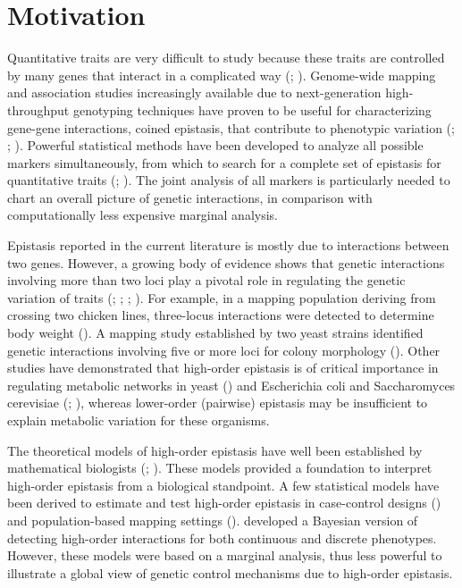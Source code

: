 \documentclass[11pt,]{book}
\theoremstyle{definition}
\theoremstyle{definition}
\theoremstyle{remark}
\begin{document}
\section{Motivation}\label{motivation-1}

Quantitative traits are very difficult to study because these traits are
controlled by many genes that interact in a complicated way
(\cite{nelson2013century}; \cite{mackay2014epistasis}). Genome-wide
mapping and association studies increasingly available due to
next-generation high-throughput genotyping techniques have proven to be
useful for characterizing gene-gene interactions, coined epistasis, that
contribute to phenotypic variation (\cite{cordell2009detecting};
\cite{van2011travelling}; \cite{wei2014detecting}). Powerful statistical
methods have been developed to analyze all possible markers
simultaneously, from which to search for a complete set of epistasis for
quantitative traits (\cite{li2014fast}; \cite{gosik2016iform}). The
joint analysis of all markers is particularly needed to chart an overall
picture of genetic interactions, in comparison with computationally less
expensive marginal analysis.

Epistasis reported in the current literature is mostly due to
interactions between two genes. However, a growing body of evidence
shows that genetic interactions involving more than two loci play a
pivotal role in regulating the genetic variation of traits
(\cite{wang2010general}; \cite{dowell2010genotype};
\cite{pang2013statistical}; \cite{taylor2014genetic}). For example, in a
mapping population deriving from crossing two chicken lines, three-locus
interactions were detected to determine body weight
(\cite{pettersson2011replication}). A mapping study established by two
yeast strains identified genetic interactions involving five or more
loci for colony morphology (\cite{taylor2014genetic}). Other studies
have demonstrated that high-order epistasis is of critical importance in
regulating metabolic networks in yeast (\cite{weinreich2013should}) and
Escherichia coli and Saccharomyces cerevisiae
(\cite{imielinski2008exploiting}; \cite{he2010prevalent}), whereas
lower-order (pairwise) epistasis may be insufficient to explain
metabolic variation for these organisms.

The theoretical models of high-order epistasis have well been
established by mathematical biologists (\cite{hansen2001epistasis};
\cite{beerenwinkel2007analysis}). These models provided a foundation to
interpret high-order epistasis from a biological standpoint. A few
statistical models have been derived to estimate and test high-order
epistasis in case-control designs (\cite{wang2015bayesian}) and
population-based mapping settings (\cite{pang2013statistical}).
\cite{wang2015bayesian} developed a Bayesian version of detecting
high-order interactions for both continuous and discrete phenotypes.
However, these models were based on a marginal analysis, thus less
powerful to illustrate a global view of genetic control mechanisms due
to high-order epistasis.
\end{document}
